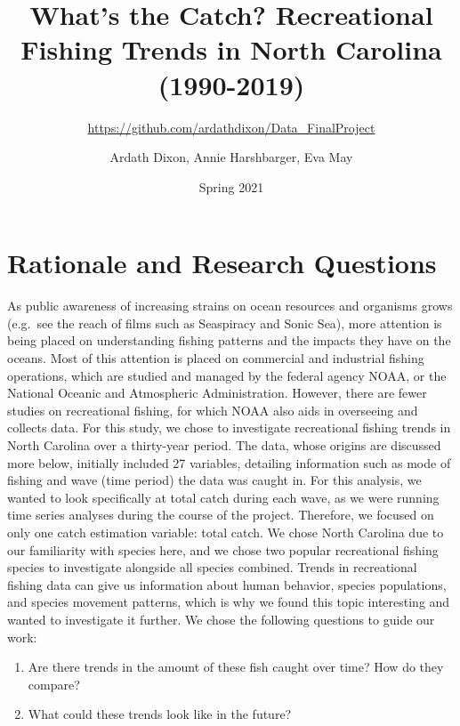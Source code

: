 \documentclass[
  12pt,
]{article}
\title{What's the Catch? Recreational Fishing Trends in North Carolina
(1990-2019)}
\subtitle{\url{https://github.com/ardathdixon/Data_FinalProject}}
\author{Ardath Dixon, Annie Harshbarger, Eva May}
\date{Spring 2021}
\begin{document}
\maketitle

\newpage
\tableofcontents 
\newpage
\listoftables 
\newpage
\listoffigures 
\newpage

\hypertarget{rationale-and-research-questions}{%
\section{Rationale and Research
Questions}\label{rationale-and-research-questions}}

As public awareness of increasing strains on ocean resources and
organisms grows (e.g.~see the reach of films such as Seaspiracy and
Sonic Sea), more attention is being placed on understanding fishing
patterns and the impacts they have on the oceans. Most of this attention
is placed on commercial and industrial fishing operations, which are
studied and managed by the federal agency NOAA, or the National Oceanic
and Atmospheric Administration. However, there are fewer studies on
recreational fishing, for which NOAA also aids in overseeing and
collects data. For this study, we chose to investigate recreational
fishing trends in North Carolina over a thirty-year period. The data,
whose origins are discussed more below, initially included 27 variables,
detailing information such as mode of fishing and wave (time period) the
data was caught in. For this analysis, we wanted to look specifically at
total catch during each wave, as we were running time series analyses
during the course of the project. Therefore, we focused on only one
catch estimation variable: total catch. We chose North Carolina due to
our familiarity with species here, and we chose two popular recreational
fishing species to investigate alongside all species combined. Trends in
recreational fishing data can give us information about human behavior,
species populations, and species movement patterns, which is why we
found this topic interesting and wanted to investigate it further. We
chose the following questions to guide our work:

\begin{enumerate}
\def\labelenumi{\arabic{enumi}.}
\item
  Are there trends in the amount of these fish caught over time? How do
  they compare?
\item
  What could these trends look like in the future?
\end{enumerate}
\end{document}
